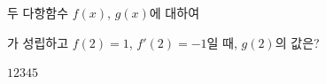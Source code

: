 두 다항함수 $f(x)$, $g(x)$에 대하여 \par\smallskip{}\par\smallskip\noindent 가 성립하고 $f(2)=1$, $f'(2)=-1$일 때, $g(2)$의 값은? 
\begin{choices32}{$1$}{$2$}{$3$}{$4$}{$5$}\end{choices32}
